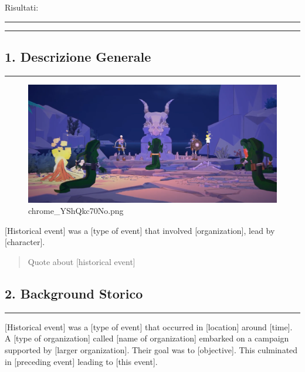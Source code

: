 Risultati:

\begin{center}\rule{0.5\linewidth}{0.5pt}\end{center}

\begin{center}\rule{0.5\linewidth}{0.5pt}\end{center}

\subsection{1. Descrizione Generale}\label{descrizione-generale}

\begin{center}\rule{0.5\linewidth}{0.5pt}\end{center}

\begin{figure}
\centering
\includegraphics{chrome_YShQkc70No.png}
\caption{chrome\_YShQkc70No.png}
\end{figure}

{[}Historical event{]} was a {[}type of event{]} that involved
{[}organization{]}, lead by {[}character{]}.

\begin{quote}
Quote about {[}historical event{]}
\end{quote}

\subsection{2. Background Storico}\label{background-storico}

\begin{center}\rule{0.5\linewidth}{0.5pt}\end{center}

{[}Historical event{]} was a {[}type of event{]} that occurred in
{[}location{]} around {[}time{]}. A {[}type of organization{]} called
{[}name of organization{]} embarked on a campaign supported by {[}larger
organization{]}. Their goal was to {[}objective{]}. This culminated in
{[}preceding event{]} leading to {[}this event{]}.

